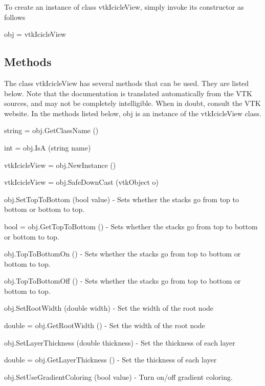 To create an instance of class vtk\-Icicle\-View, simply invoke its constructor as follows \begin{DoxyVerb}  obj = vtkIcicleView
\end{DoxyVerb}
 \hypertarget{vtkwidgets_vtkxyplotwidget_Methods}{}\subsection{Methods}\label{vtkwidgets_vtkxyplotwidget_Methods}
The class vtk\-Icicle\-View has several methods that can be used. They are listed below. Note that the documentation is translated automatically from the V\-T\-K sources, and may not be completely intelligible. When in doubt, consult the V\-T\-K website. In the methods listed below, {\ttfamily obj} is an instance of the vtk\-Icicle\-View class. 
\begin{DoxyItemize}
\item {\ttfamily string = obj.\-Get\-Class\-Name ()}  
\item {\ttfamily int = obj.\-Is\-A (string name)}  
\item {\ttfamily vtk\-Icicle\-View = obj.\-New\-Instance ()}  
\item {\ttfamily vtk\-Icicle\-View = obj.\-Safe\-Down\-Cast (vtk\-Object o)}  
\item {\ttfamily obj.\-Set\-Top\-To\-Bottom (bool value)} -\/ Sets whether the stacks go from top to bottom or bottom to top.  
\item {\ttfamily bool = obj.\-Get\-Top\-To\-Bottom ()} -\/ Sets whether the stacks go from top to bottom or bottom to top.  
\item {\ttfamily obj.\-Top\-To\-Bottom\-On ()} -\/ Sets whether the stacks go from top to bottom or bottom to top.  
\item {\ttfamily obj.\-Top\-To\-Bottom\-Off ()} -\/ Sets whether the stacks go from top to bottom or bottom to top.  
\item {\ttfamily obj.\-Set\-Root\-Width (double width)} -\/ Set the width of the root node  
\item {\ttfamily double = obj.\-Get\-Root\-Width ()} -\/ Set the width of the root node  
\item {\ttfamily obj.\-Set\-Layer\-Thickness (double thickness)} -\/ Set the thickness of each layer  
\item {\ttfamily double = obj.\-Get\-Layer\-Thickness ()} -\/ Set the thickness of each layer  
\item {\ttfamily obj.\-Set\-Use\-Gradient\-Coloring (bool value)} -\/ Turn on/off gradient coloring.  

\end{DoxyItemize}

